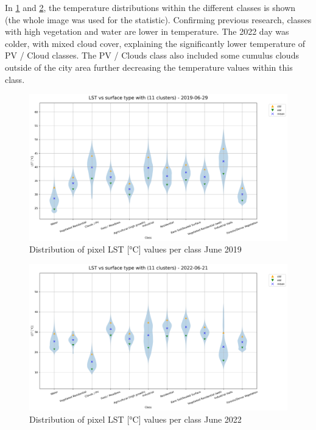 \documentclass[12pt,a4paper, english,twoside]{scrartcl}
\begin{document}
      In \cref{fig:lstclusters19} and \cref{fig:lstclusters22}, the temperature distributions within the different classes is shown (the whole image was used for the statistic). 
      Confirming previous research, classes with high vegetation and water are lower in temperature. 
      The 2022 day was colder, with mixed cloud cover, explaining the significantly lower temperature of PV / Cloud classes.
      The PV / Clouds class also included some cumulus clouds outside of the city area further decreasing the temperature values within this class. 


       \begin{landscape}
         \begin{figure}[!p]
           \centering
           \includegraphics[width=0.91\linewidth]{img/LST vs surface type with (11 clusters) - 2019-06-29.png}
           \caption{Distribution of pixel \gls{LST} [°C] values per class June 2019 \label{fig:lstclusters19}}
         \end{figure}

         \begin{figure}[!p]
           \centering
           \includegraphics[width=0.91\linewidth]{img/LST vs surface type with (11 clusters) - 2022-06-21.png}
           \caption{Distribution of pixel \gls{LST} [°C] values per class June 2022 \label{fig:lstclusters22}}
         \end{figure}
       \end{landscape}
\end{document}
